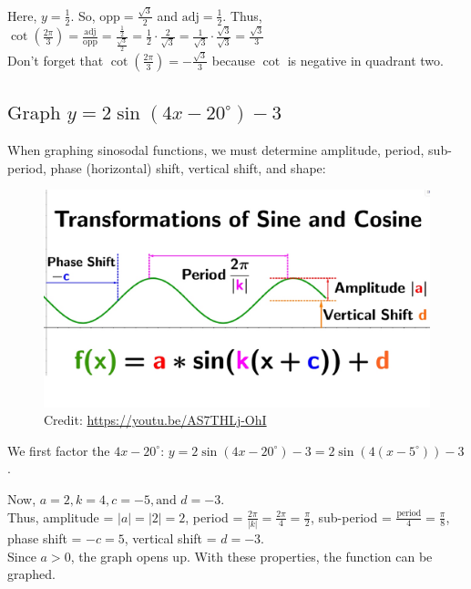 \documentclass[12pt]{article}
\begin{document}
Here, \(y=\frac{1}{2}\). So, \(\text{opp}=\frac{\sqrt{3}}{2}\) and \(\text{adj}=\frac{1}{2}\). Thus, \(\cot\left( \frac{2\pi}{3}\right) =\frac{\text{adj}}{\text{opp}}=\frac{\frac{1}{2}}{\frac{\sqrt{3}}{2}}=\frac{1}{2}\cdot\frac{2}{\sqrt{3}}=\frac{1}{\sqrt{3}}\cdot\frac{\sqrt{3}}{\sqrt{3}}=\frac{\sqrt{3}}{3}\)\\

Don't forget that \(\cot\left( \frac{2\pi}{3}\right)=-\frac{\sqrt{3}}{3}\) because \(\cot\) is negative in quadrant two.

\subsection{\(\text{Graph } y=2\sin(4x-20^{\circ})-3\)}


When graphing sinosodal functions, we must determine amplitude, period, sub-period, phase (horizontal) shift, vertical shift, and shape:\\

\begin{figure}[H]
	\centering
	\includegraphics[scale=0.2]{maxresdefault.jpg}
	\caption{Credit: \url{https://youtu.be/AS7THLj-OhI}}
\end{figure}

We first factor the \(4x-20^{\circ}\): \(y=2\sin(4x-20^{\circ})-3=2\sin(4(x-5^{\circ}))-3\).

Now, \(a=2, k=4, c=-5, \text{and } d=-3\).\\

Thus, amplitude = \(|a|=|2|=2\), period = \(\frac{2\pi}{|k|}=\frac{2\pi}{4}=\frac{\pi}{2}\), sub-period = \(\frac{\text{period}}{4}=\frac{\pi}{8}\), phase shift = \(-c=5\), vertical shift = \(d=-3\).\\

Since \(a>0\), the graph opens up. With these properties, the function can be graphed.\\
\end{document}
